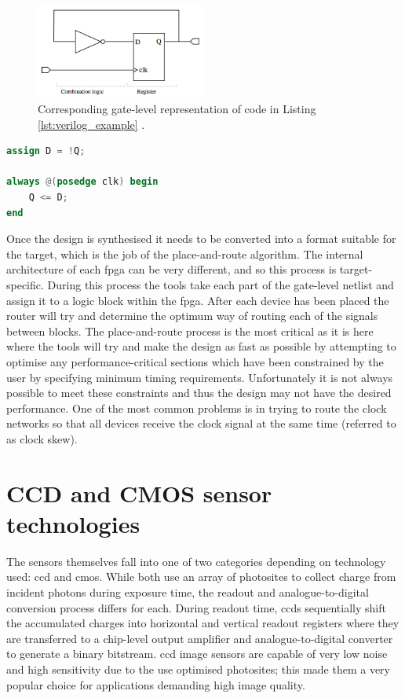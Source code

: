 \begin{figure}
  \centering
  \includegraphics[width=0.5\textwidth]{./img/gate_level.png}
  \caption{Corresponding gate-level representation of code in Listing \ref{lst:verilog_example} \cite{gate_level}.}
  \label{fig:gate_level}
\end{figure}

\begin{lstlisting}[caption={A basic Verilog example of a register being fed with its own inverted output.}, label={lst:verilog_example}, language=Verilog]
assign D = !Q;

always @(posedge clk) begin
    Q <= D;
end
\end{lstlisting}

Once the design is synthesised it needs to be converted into a format suitable for the target, which is the job of the place-and-route algorithm. The internal architecture of each \gls{fpga} can be very different, and so this process is target-specific. During this process the tools take each part of the gate-level netlist and assign it to a logic block within the \gls{fpga}. After each device has been placed the router will try and determine the optimum way of routing each of the signals between blocks. The place-and-route process is the most critical as it is here where the tools will try and make the design as fast as possible by attempting to optimise any performance-critical sections which have been constrained by the user by specifying minimum timing requirements. Unfortunately it is not always possible to meet these constraints and thus the design may not have the desired performance. One of the most common problems is in trying to route the clock networks so that all devices receive the clock signal at the same time (referred to as clock skew).

\section{CCD and CMOS sensor technologies}

The sensors themselves fall into one of two categories depending on technology used: \gls{ccd} and \gls{cmos}. While both use an array of photosites to collect charge from incident photons during exposure time, the readout and analogue-to-digital conversion process differs for each. During readout time, \glspl{ccd} sequentially shift the accumulated charges into horizontal and vertical readout registers where they are transferred to a chip-level output amplifier and analogue-to-digital converter to generate a binary bitstream. \gls{ccd} image sensors are capable of very low noise and high sensitivity due to the use optimised photosites; this made them a very popular choice for applications demanding high image quality.

